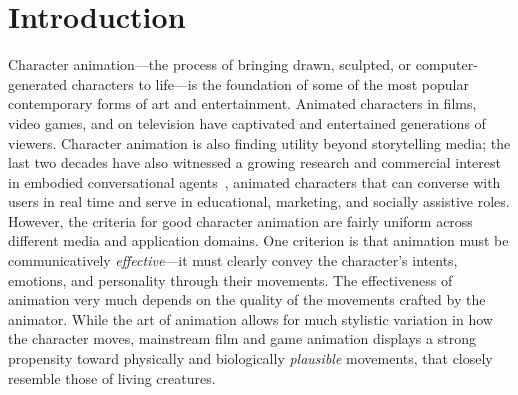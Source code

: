 \pagestyle{deposit}

\chapter{Introduction}

Character animation---the process of bringing drawn, sculpted, or computer-generated characters to life---is the foundation of some of the most popular contemporary forms of art and entertainment. Animated characters in films, video games, and on television have captivated and entertained generations of viewers. Character animation is also finding utility beyond storytelling media; the last two decades have also witnessed a growing research and commercial interest in embodied conversational agents~\citep{cassell2000embodied}, animated characters that can converse with users in real time and serve in educational, marketing, and socially assistive roles.
However, the criteria for good character animation are fairly uniform across different media and application domains. One criterion is that animation must be communicatively \emph{effective}---it must clearly convey the character's intents, emotions, and personality through their movements.
The effectiveness of animation very much depends on the quality of the movements crafted by the animator. While the art of animation allows for much stylistic variation in how the character moves, mainstream film and game animation displays a strong propensity toward physically and biologically \emph{plausible} movements, that closely resemble those of living creatures.

